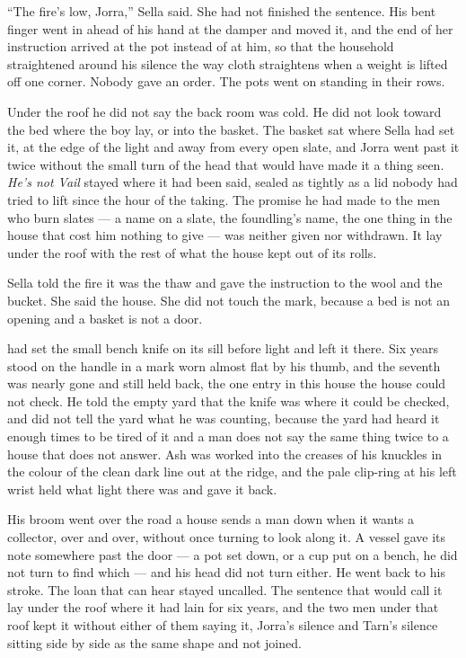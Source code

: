 “The fire's low, Jorra,” Sella said. She had not finished the sentence. His bent finger went in ahead of his hand at the damper and moved it, and the end of her instruction arrived at the pot instead of at him, so that the household straightened around his silence the way cloth straightens when a weight is lifted off one corner. Nobody gave an order. The pots went on standing in their rows.

\scenebreak

Under the roof he did not say the back room was cold. He did not look toward the bed where the boy lay, or into the basket. The basket sat where Sella had set it, at the edge of the light and away from every open slate, and Jorra went past it twice without the small turn of the head that would have made it a thing seen. \emph{He's not Vail} stayed where it had been said, sealed as tightly as a lid nobody had tried to lift since the hour of the taking. The promise he had made to the men who burn slates --- a name on a slate, the foundling's name, the one thing in the house that cost him nothing to give --- was neither given nor withdrawn. It lay under the roof with the rest of what the house kept out of its rolls.

Sella told the fire it was the thaw and gave the instruction to the wool and the bucket. She said the house. She did not touch the mark, because a bed is not an opening and a basket is not a door.

 had set the small bench knife on its sill before light and left it there. Six years stood on the handle in a mark worn almost flat by his thumb, and the seventh was nearly gone and still held back, the one entry in this house the house could not check. He told the empty yard that the knife was where it could be checked, and did not tell the yard what he was counting, because the yard had heard it enough times to be tired of it and a man does not say the same thing twice to a house that does not answer. Ash was worked into the creases of his knuckles in the colour of the clean dark line out at the ridge, and the pale clip-ring at his left wrist held what light there was and gave it back.

His broom went over the road a house sends a man down when it wants a collector, over and over, without once turning to look along it. A vessel gave its note somewhere past the door --- a pot set down, or a cup put on a bench, he did not turn to find which --- and his head did not turn either. He went back to his stroke. The loan that can hear stayed uncalled. The sentence that would call it lay under the roof where it had lain for six years, and the two men under that roof kept it without either of them saying it, Jorra's silence and Tarn's silence sitting side by side as the same shape and not joined.

